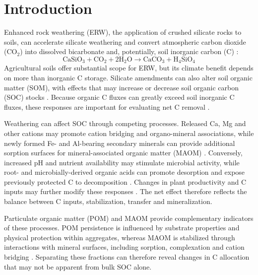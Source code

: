 \documentclass[preprint,12pt]{elsarticle}
\begin{document}

\section{Introduction}
\label{sec:introduction}

Enhanced rock weathering (ERW), the application of crushed silicate rocks to soils, can accelerate silicate weathering and convert atmospheric carbon dioxide (CO$_2$) into dissolved bicarbonate and, potentially, soil inorganic carbon (C)
\citep{Hartmann2008,manning2024soil}:
\begin{equation}
    \mathrm{CaSiO_3 + CO_2 + 2H_2O
    \rightarrow CaCO_3 + H_4SiO_4}
    \label{eq:carbonation}
\end{equation}
Agricultural soils offer substantial scope for ERW, but its climate benefit depends on more than inorganic C storage. Silicate amendments can also alter soil organic matter (SOM), with effects that may increase or decrease soil organic carbon (SOC) stocks 
\citep{Vicca2022,steinwidder2025beyond,sokol2024reduced}. Because organic C fluxes can greatly exceed soil inorganic C fluxes, these responses are important for evaluating net C removal 
\citep{Niron2024,manning2024soil}.

Weathering can affect SOC through competing processes. Released Ca, Mg and other cations may promote cation bridging and organo-mineral associations, while newly formed Fe- and Al-bearing secondary minerals can provide additional sorption surfaces for mineral-associated organic matter (MAOM) 
\citep{Vienne2025}. Conversely, increased pH and nutrient availability may stimulate microbial activity, while root- and microbially-derived organic acids can promote desorption and expose previously protected C to decomposition 
\citep{Niron2024,sokol2024reduced,Wang2024}. Changes in plant productivity and C inputs may further modify these responses 
\citep{stoner2021turnover}. The net effect therefore reflects the balance between C inputs, stabilization, transfer and mineralization.

Particulate organic matter (POM) and MAOM provide complementary indicators of these processes. POM persistence is influenced by substrate properties and physical protection within aggregates, whereas MAOM is stabilized through interactions with mineral surfaces, including sorption, complexation and cation bridging 
\citep{lavallee2019conceptualizing,rocci2024bridging}. Separating these fractions can therefore reveal changes in C allocation that may not be apparent from bulk SOC alone.
\end{document}
